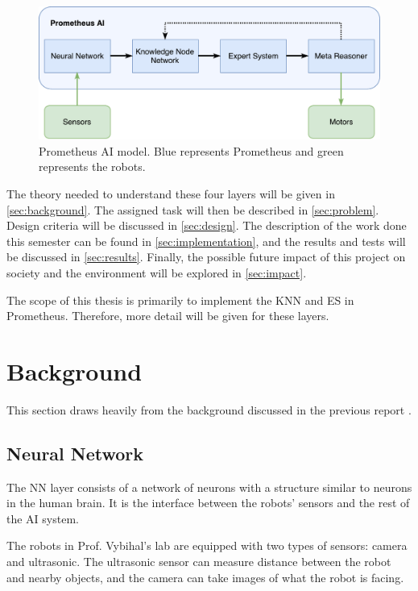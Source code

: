 \documentclass[titlepage,11pt]{article}
\begin{document}
\begin{figure}[!htb]
	\includegraphics[width=\textwidth]{figures/ai_model.pdf}
	\caption[Prometheus AI model.]{Prometheus AI model. Blue represents Prometheus and green represents the robots.}
	\label{model}
\end{figure}

The theory needed to understand these four layers will be given in \autoref{sec:background}. The assigned task will then be described in \autoref{sec:problem}. Design criteria will be discussed in \autoref{sec:design}. The description of the work done this semester can be found in \autoref{sec:implementation}, and the results and tests will be discussed in \autoref{sec:results}. Finally, the possible future impact of this project on society and the environment will be explored in \autoref{sec:impact}.

The scope of this thesis is primarily to implement the KNN and ES in Prometheus. Therefore, more detail will be given for these layers.

\section{Background} \label{sec:background}
This section draws heavily from the background discussed in the previous report \cite{stappas}.

\subsection{Neural Network}

The NN layer consists of a network of neurons with a structure similar to neurons in the human brain. It is the interface between the robots' sensors and the rest of the AI system.

The robots in Prof. Vybihal's lab are equipped with two types of sensors: camera and ultrasonic. The ultrasonic sensor can measure distance between the robot and nearby objects, and the camera can take images of what the robot is facing.
\end{document}
